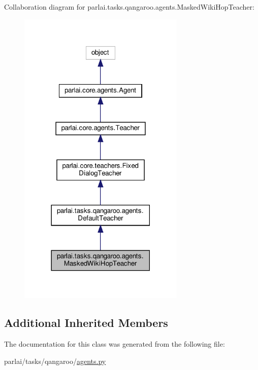 Collaboration diagram for parlai.\+tasks.\+qangaroo.\+agents.\+Masked\+Wiki\+Hop\+Teacher\+:
\nopagebreak
\begin{figure}[H]
\begin{center}
\leavevmode
\includegraphics[width=225pt]{classparlai_1_1tasks_1_1qangaroo_1_1agents_1_1MaskedWikiHopTeacher__coll__graph}
\end{center}
\end{figure}
\subsection*{Additional Inherited Members}


The documentation for this class was generated from the following file\+:\begin{DoxyCompactItemize}
\item 
parlai/tasks/qangaroo/\hyperlink{parlai_2tasks_2qangaroo_2agents_8py}{agents.\+py}\end{DoxyCompactItemize}
